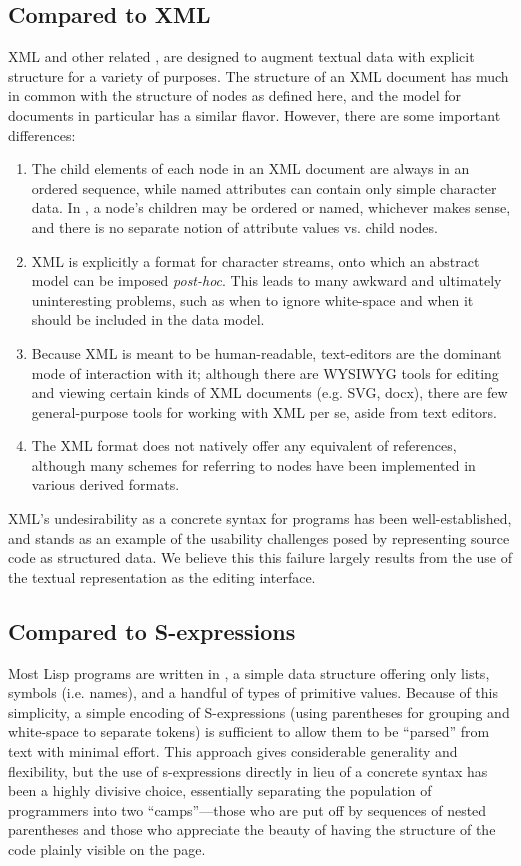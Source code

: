 \subsection{Compared to XML}
XML and other related , are designed to augment textual data with explicit structure for a variety of purposes. The structure of an XML document has much in common with the structure of nodes as defined here, and the \cite{infoset} model for documents in particular has a similar flavor. However, there are some important differences:
\begin{enumerate}
\item The child elements of each node in an XML document are always in an ordered sequence, while named attributes can contain only simple character data. In \Meta, a node's children may be ordered or named, whichever makes sense, and there is no separate notion of attribute values vs. child nodes.
\item XML is explicitly a format for character streams, onto which an abstract model can be imposed \textit{post-hoc}. This leads to many awkward and ultimately uninteresting problems, such as when to ignore white-space and when it should be included in the data model.
\item Because XML is meant to be human-readable, text-editors are the dominant mode of interaction with it; although there are WYSIWYG tools for editing and viewing certain kinds of XML documents (e.g. SVG\cite{svg}, docx\cite{openoffice}), there are few general-purpose tools for working with XML per se, aside from text editors.
\item The XML format does not natively offer any equivalent of references, although many schemes for referring to nodes have been implemented in various derived formats.
\end{enumerate}

XML's undesirability as a concrete syntax for programs has been well-established, and stands as an example of the usability challenges posed by representing source code as structured data\cite{holub}\cite{xml-bad-ant}. We believe this this failure largely results from the use of the textual representation as the editing interface.

\subsection{Compared to S-expressions}
Most Lisp programs are written in , a simple data structure offering only lists, symbols (i.e. names), and a handful of types of primitive values. Because of this simplicity, a simple encoding of S-expressions (using parentheses for grouping and white-space to separate tokens) is sufficient to allow them to be ``parsed'' from text with minimal effort. This approach gives considerable generality and flexibility, but the use of s-expressions directly in lieu of a concrete syntax has been a highly divisive choice, essentially separating the population of programmers into two ``camps''---those who are put off by sequences of nested parentheses and those who appreciate the beauty of having the structure of the code plainly visible on the page\cite{?}.

